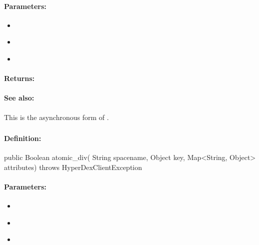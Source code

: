 \paragraph{Parameters:}
\begin{itemize}[noitemsep]
\item {}\\

\item {}\\

\item {}\\

\end{itemize}

\paragraph{Returns:}


\paragraph{See also:}  This is the asynchronous form of .

\pagebreak
\subsubsection{}
\label{api:java:atomic_div}


\paragraph{Definition:}
\begin{javacode}
public Boolean atomic_div(
        String spacename,
        Object key,
        Map<String, Object> attributes) throws HyperDexClientException
\end{javacode}

\paragraph{Parameters:}
\begin{itemize}[noitemsep]
\item {}\\

\item {}\\

\item {}\\

\end{itemize}

